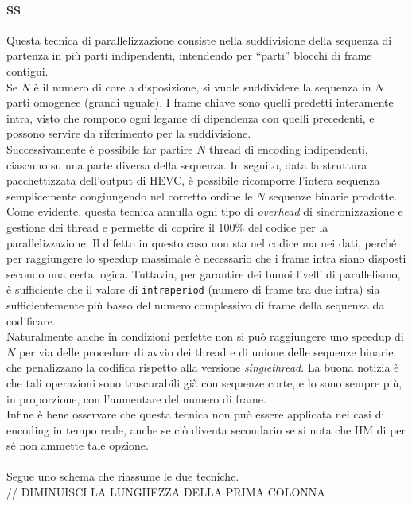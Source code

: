 \paragraph*{SS} Questa tecnica di parallelizzazione consiste nella suddivisione 
della sequenza di partenza in più parti indipendenti, intendendo per 
``parti'' blocchi di frame contigui.\\
Se $N$ è il numero di core a disposizione, 
si vuole suddividere la sequenza in $N$ parti omogenee (grandi uguale). I frame 
chiave sono quelli predetti interamente intra, visto che rompono ogni 
legame di dipendenza con quelli precedenti, e possono servire da riferimento 
per la suddivisione.\\
Successivamente è possibile far partire $N$ thread di encoding 
indipendenti, ciascuno su una parte diversa della sequenza. In seguito, data la 
struttura 
pacchettizzata dell'output di HEVC, è possibile ricomporre l'intera 
sequenza semplicemente congiungendo nel corretto ordine le $N$ sequenze binarie 
prodotte. \\
Come evidente, questa tecnica annulla ogni tipo di \emph{overhead} di 
sincronizzazione e gestione dei thread e permette di coprire il $100\%$ del 
codice per la parallelizzazione. Il difetto in questo caso non sta nel codice 
ma nei dati, perché per raggiungere lo speedup massimale è necessario che i 
frame intra siano disposti secondo una certa logica. Tuttavia, per garantire 
dei bunoi livelli di parallelismo, è sufficiente che il valore di 
\verb|intraperiod| (numero di frame tra due intra) sia sufficientemente più 
basso del numero complessivo di frame della sequenza da codificare. \\
Naturalmente anche in condizioni perfette non si può raggiungere uno speedup di 
$N$ per via delle procedure di avvio dei thread e di
unione delle sequenze binarie, che penalizzano la codifica 
rispetto alla versione \emph{singlethread}. La buona 
notizia è che tali operazioni sono trascurabili già con sequenze corte, e lo 
sono sempre più, in proporzione, con l'aumentare del numero di frame.\\
Infine è bene osservare che questa tecnica non può essere applicata 
nei casi di encoding in tempo reale, anche se ciò diventa secondario se si nota 
che HM di per sé non ammette tale opzione.
\\ \\
Segue uno schema che riassume le due tecniche.
\\ // DIMINUISCI LA LUNGHEZZA DELLA PRIMA COLONNA
